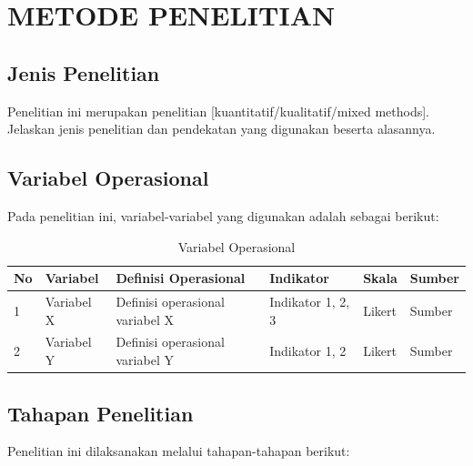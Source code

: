 
\chapter{METODE PENELITIAN}
\label{bab:metode}

\section{Jenis Penelitian}
\label{sec:jenis-penelitian}

Penelitian ini merupakan penelitian [kuantitatif/kualitatif/mixed methods]. Jelaskan
jenis penelitian dan pendekatan yang digunakan beserta alasannya.

\section{Variabel Operasional}
\label{sec:variabel-operasional}

Pada penelitian ini, variabel-variabel yang digunakan adalah sebagai berikut:

\begin{table}[H]
\caption{Variabel Operasional}
\label{tab:variabel-operasional}
\begin{isitable}
\begin{tabular}{p{0.5cm} p{2.5cm} p{3.5cm} p{3.5cm} p{2.5cm} p{1.5cm}}
\toprule
\textbf{No} & \textbf{Variabel} & \textbf{Definisi Operasional} & \textbf{Indikator} & \textbf{Skala} & \textbf{Sumber} \\
\midrule
1 & Variabel X & Definisi operasional variabel X & Indikator 1, 2, 3 & Likert & Sumber \\
2 & Variabel Y & Definisi operasional variabel Y & Indikator 1, 2 & Likert & Sumber \\
\bottomrule
\end{tabular}
\end{isitable}
\end{table}

\section{Tahapan Penelitian}
\label{sec:tahapan-penelitian}

Penelitian ini dilaksanakan melalui tahapan-tahapan berikut:

